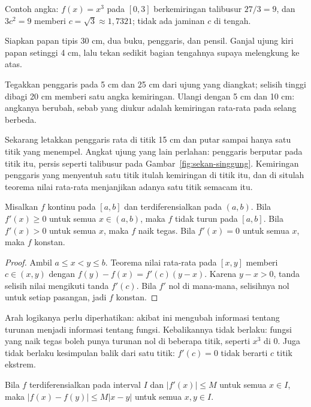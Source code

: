 Contoh angka: $f(x)=x^{3}$ pada $[0,3]$ berkemiringan talibusur $27/3=9$, dan $3c^{2}=9$
memberi $c=\sqrt{3}\approx1{,}7321$; tidak ada jaminan $c$ di tengah.

\begin{tangan}
Siapkan papan tipis 30 cm, dua buku, penggaris, dan pensil. Ganjal ujung kiri papan setinggi
4 cm, lalu tekan sedikit bagian tengahnya supaya melengkung ke atas.

Tegakkan penggaris pada 5 cm dan 25 cm dari ujung yang diangkat; selisih tinggi dibagi 20 cm
memberi satu angka kemiringan. Ulangi dengan 5 cm dan 10 cm: angkanya berubah, sebab yang
diukur adalah kemiringan rata-rata pada selang berbeda.

Sekarang letakkan penggaris rata di titik 15 cm dan putar sampai hanya satu titik yang
menempel. Angkat ujung yang lain perlahan: penggaris berputar pada titik itu, persis seperti
talibusur pada Gambar~\ref{fig:sekan-singgung}. Kemiringan penggaris yang menyentuh satu
titik itulah kemiringan di titik itu, dan di situlah teorema nilai rata-rata menjanjikan
adanya satu titik semacam itu.
\end{tangan}

\begin{akibat}
Misalkan $f$ kontinu pada $[a,b]$ dan terdiferensialkan pada $(a,b)$. Bila $f'(x)\ge0$ untuk
semua $x\in(a,b)$, maka $f$ tidak turun pada $[a,b]$. Bila $f'(x)>0$ untuk semua $x$, maka
$f$ naik tegas. Bila $f'(x)=0$ untuk semua $x$, maka $f$ konstan.
\end{akibat}

\begin{proof}
Ambil $a\le x<y\le b$. Teorema nilai rata-rata pada $[x,y]$ memberi $c\in(x,y)$ dengan
$f(y)-f(x)=f'(c)(y-x)$. Karena $y-x>0$, tanda selisih nilai mengikuti tanda $f'(c)$. Bila
$f'$ nol di mana-mana, selisihnya nol untuk setiap pasangan, jadi $f$ konstan.
\end{proof}

Arah logikanya perlu diperhatikan: akibat ini mengubah informasi tentang turunan menjadi
informasi tentang fungsi. Kebalikannya tidak berlaku: fungsi yang naik tegas boleh punya
turunan nol di beberapa titik, seperti $x^{3}$ di $0$. Juga tidak berlaku kesimpulan balik
dari satu titik: $f'(c)=0$ tidak berarti $c$ titik ekstrem.

\begin{akibat}[Keterkendalian]
Bila $f$ terdiferensialkan pada interval $I$ dan $|f'(x)|\le M$ untuk semua $x\in I$, maka
$|f(x)-f(y)|\le M|x-y|$ untuk semua $x,y\in I$.
\end{akibat}

